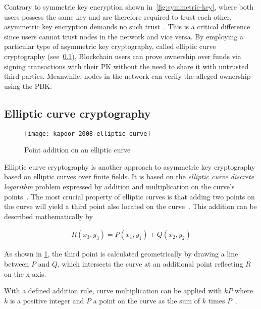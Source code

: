 Contrary to symmetric key encryption shown in~\cref{fig:symmetric-key}, where both users possess the same key and are therefore required to trust each other, asymmetric key encryption demands no such trust~\autocites[84]{chandra_comparative_2014}[11]{yaga_blockchain_2018}.
This is a critical difference since users cannot trust nodes in the network and vice versa.
By employing a particular type of asymmetric key cryptography, called elliptic curve cryptography (see~\cref{subsec:elliptic-curve-cryptography}), \gls{Blockchain} users can prove ownership over funds via signing transactions with their \gls{PK} without the need to share it with untrusted third parties.
Meanwhile, nodes in the network can verify the alleged ownership using the \gls{PBK}.

\subsection{Elliptic curve cryptography}\label{subsec:elliptic-curve-cryptography}

\begin{figure}[H]
    \begin{center}
        \texttt{[image: kapoor-2008-elliptic\_curve]}
    \end{center}
    \caption[Point addition on an elliptic curve]{Point addition on an elliptic curve~\autocite[5]{kapoor_elliptic_2008}}
    \label{fig:elliptic-curve}
\end{figure}

Elliptic curve cryptography is another approach to asymmetric key cryptography based on elliptic curves over finite fields.
It is based on the \emph{elliptic curve discrete logarithm} problem expressed by addition and multiplication on the curve's points~\autocites[65]{antonopoulos_mastering_2017}[5]{kapoor_elliptic_2008}.
The most crucial property of elliptic curves is that adding two points on the curve will yield a third point also located on the curve~\autocite[5]{kapoor_elliptic_2008}.
This addition can be described mathematically by

\begin{align}\label{eq:curve-addition}
    R(x_3,y_3)=P(x_1,y_1)+Q(x_2,y_2)
\end{align}

As shown in \cref{fig:elliptic-curve}, the third point is calculated geometrically by drawing a line between $P$ and $Q$, which intersects the curve at an additional point reflecting $R$ on the x-axis.

With a defined addition rule, curve multiplication can be applied with $kP$ where $k$ is a positive integer and $P$ a point on the curve as the sum of $k$ times $P$~\autocite[5]{kapoor_elliptic_2008}.

